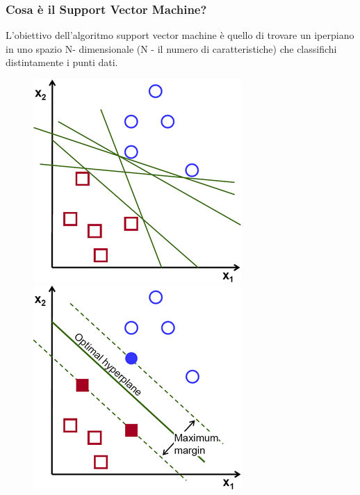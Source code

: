 \subsubsection{Cosa è il Support Vector Machine?}
L'obiettivo dell'algoritmo support vector machine è quello di trovare un iperpiano in uno spazio N- dimensionale (N - il numero di caratteristiche) che classifichi distintamente i punti dati.
\begin{figure}[h]
  \begin{minipage}[b]{0.45\linewidth}
    \centering
    \includegraphics[width=\linewidth]{images/image25.png}
  \end{minipage}
  \begin{minipage}[b]{0.45\linewidth}
    \centering
    \includegraphics[width=\linewidth]{images/image26.png}
  \end{minipage}
\end{figure}

